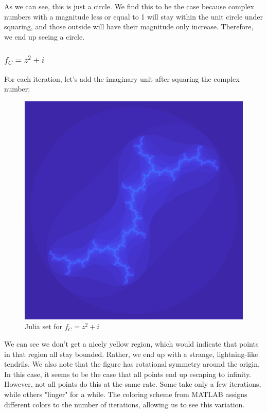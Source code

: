 \documentclass[12pt]{article}
\begin{document}
As we can see, this is just a circle. We find this to be the case because complex numbers with a magnitude less or equal to 1 will stay within the unit circle under squaring, and those outside will have their magnitude only increase. Therefore, we end up seeing a circle. 

\subsubsection{$f_C = z^2 + i$}

For each iteration, let's add the imaginary unit after squaring the complex number: 

\begin{figure}[H]
	\centering
	\includegraphics[scale=0.5]{Ceqi.png}
	\caption{Julia set for $f_C = z^2 + i$}
\end{figure}

We can see we don't get a nicely yellow region, which would indicate that points in that region all stay bounded. Rather, we end up with a strange, lightning-like tendrils. We also note that the figure has rotational symmetry around the origin. In this case, it seems to be the case that all points end up escaping to infinity. However, not all points do this at the same rate. Some take only a few iterations, while others "linger" for a while. The coloring scheme from MATLAB assigns different colors to the number of iterations, allowing us to see this variation. 
\end{document}
